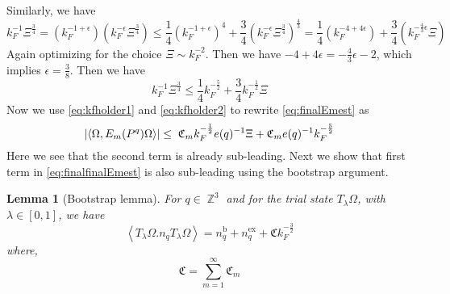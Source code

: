 \documentclass[sn-mathphys, Numbered ,a4paper]{sn-jnl}%
\DeclareMathOperator{\Z}{\mathbb{Z}}
\newcommand{\half}{\frac{1}{2}}
\newcommand{\eva}[1]{\left\langle #1 \right\rangle}
\theoremstyle{plain}
\newtheorem{lemma}[theorem]{Lemma}
\theoremstyle{definition}
\theoremstyle{remark}
\theoremstyle{plain}
\theoremstyle{definition}
\theoremstyle{remark}
\begin{document}
Similarly, we have
\begin{equation}
	k_{F}^{-1} \Xi^{\frac{3}{4}} = (k_{F}^{-1 +\epsilon} ) (k_{F}^{-\epsilon} \Xi^{\frac{3}{4}}) \leq \frac{1}{4}(k_{F}^{-1 +\epsilon} )^4 + \frac{3}{4}(k_{F}^{-\epsilon} \Xi^{\frac{3}{4}})^\frac{4}{3} = \frac{1}{4}(k_{F}^{-4 +4\epsilon}) + \frac{3}{4}(k_{F}^{-\frac{4}{3}\epsilon} \Xi)
\end{equation}
Again optimizing for the choice $\Xi \sim k_F^{-2}$. Then we have $-4 +4\epsilon = -\frac{4}{3}\epsilon -2 $, which implies $\epsilon =\frac{3}{8}$. Then we have
\begin{equation} \label{eq:kfholder2}
	k_{F}^{-1} \Xi^{\frac{3}{4}} \leq \frac{1}{4} k_{F}^{-\frac{5}{2}} + \frac{3}{4} k_{F}^{-\half} \Xi
\end{equation}
Now we use \eqref{eq:kfholder1} and \eqref{eq:kfholder2} to rewrite \eqref{eq:finalEmest} as
\begin{equation}
		\abs{\eva{\Omega, E_m(P^q) \Omega}} \leq \; \mathfrak{C}_m k_{F}^{-\half} e(q)^{-1}\Xi + \mathfrak{C}_m e(q)^{-1}k_F^{-\frac{5}{2}} \label{eq:finalfinalEmest}
\end{equation}
Here we see that the second term is already sub-leading.
Next we show that first term in \eqref{eq:finalfinalEmest} is also sub-leading using the bootstrap argument.
\begin{lemma}[Bootstrap lemma]
	For $q \in \Z^3$ and for the trial state $T_{\lambda}\Omega$, with $\lambda \in [0,1]$, we have 
	\begin{equation}
		\eva{ T_{\lambda}\Omega. n_q T_{\lambda}\Omega} = n_q^\mathrm{b} + n_q^\mathrm{ex} + \mathfrak{C} k_F^{-\frac{3}{2}}
	\end{equation}
where, 
\begin{equation}
	\mathfrak{C} = \sum\limits_{m=1}^\infty \mathfrak{C}_m
\end{equation}
\end{lemma}
\end{document}
